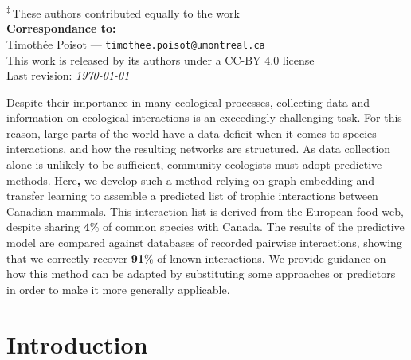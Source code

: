 \documentclass[11pt]{article}
\makeatletter
\def\maxwidth{\ifdim\Gin@nat@width>\linewidth\linewidth
\else\Gin@nat@width\fi}
\let\Oldincludegraphics\includegraphics
\renewcommand{\includegraphics}[1]{\Oldincludegraphics[width=\maxwidth]{#1}}
\providecommand{\DIFaddtex}[1]{{\bf #1}} %
\providecommand{\DIFdeltex}[1]{} %
\providecommand{\DIFaddbegin}{\protect\color{blue}} %
\providecommand{\DIFaddend}{\protect\color{black}} %
\providecommand{\DIFdelbegin}{\protect\color{red}} %
\providecommand{\DIFdelend}{\protect\color{black}} %
\providecommand{\DIFadd}[1]{\texorpdfstring{\DIFaddtex{#1}}{#1}} %
\providecommand{\DIFdel}[1]{\texorpdfstring{\DIFdeltex{#1}}{}} %
\newcommand{\DIFscaledelfig}{0.5}
\newlength{\DIFdelgraphicswidth} %
\newlength{\DIFdelgraphicsheight} %
\newcommand{\DIFaddincludegraphics}[2][]{{\color{blue}\fbox{\DIFOincludegraphics[#1]{#2}}}} %
\newcommand{\DIFdelincludegraphics}[2][]{%
\sbox{\DIFdelgraphicsbox}{\DIFOincludegraphics[#1]{#2}}%
\settoboxwidth{\DIFdelgraphicswidth}{\DIFdelgraphicsbox} %
\settoboxtotalheight{\DIFdelgraphicsheight}{\DIFdelgraphicsbox} %
\scalebox{\DIFscaledelfig}{%
\parbox[b]{\DIFdelgraphicswidth}{\usebox{\DIFdelgraphicsbox}\\[-\baselineskip] \rule{\DIFdelgraphicswidth}{0em}}\llap{\resizebox{\DIFdelgraphicswidth}{\DIFdelgraphicsheight}{%
\setlength{\unitlength}{\DIFdelgraphicswidth}%
\begin{picture}(1,1)%
\thicklines\linethickness{2pt} %
{\color[rgb]{1,0,0}\put(0,0){\framebox(1,1){}}}%
{\color[rgb]{1,0,0}\put(0,0){\line( 1,1){1}}}%
{\color[rgb]{1,0,0}\put(0,1){\line(1,-1){1}}}%
\end{picture}%
}\hspace*{3pt}}} %
} %
\DeclareRobustCommand{\DIFaddbegin}{\DIFOaddbegin \let\includegraphics\DIFaddincludegraphics} %
\DeclareRobustCommand{\DIFaddend}{\DIFOaddend \let\includegraphics\DIFOincludegraphics} %
\DeclareRobustCommand{\DIFdelbegin}{\DIFOdelbegin \let\includegraphics\DIFdelincludegraphics} %
\DeclareRobustCommand{\DIFdelend}{\DIFOaddend \let\includegraphics\DIFOincludegraphics} %
\makeatother
\begin{document}
\textsuperscript{‡}\,These authors contributed equally to the work\\

\textbf{Correspondance to:}\\
Timothée Poisot --- \texttt{timothee.poisot@umontreal.ca}\\

\vfill
This work is released by its authors under a CC-BY 4.0 license\hfill\ccby\\
Last revision: \emph{\today}

\clearpage
\thispagestyle{empty}

\vfill
Despite their importance in many ecological processes, collecting data
and information on ecological interactions is an exceedingly challenging
task. For this reason, large parts of the world have a data deficit when
it comes to species interactions, and how the resulting networks are
structured. As data collection alone is unlikely to be sufficient,
community ecologists must adopt predictive methods. Here\DIFaddbegin \DIFadd{, }\DIFaddend we develop
such a method \DIFdelbegin \DIFdel{, }\DIFdelend relying on graph embedding and transfer learning to
assemble a predicted list of trophic interactions between Canadian
mammals. This interaction list is derived from the European food web,
despite sharing \DIFdelbegin \DIFdel{only 5}\DIFdelend \DIFaddbegin \DIFadd{4}\DIFaddend \% of common species with Canada. The results of the
predictive model are compared against databases of recorded pairwise
interactions, showing that we correctly recover \DIFdelbegin \DIFdel{over 95}\DIFdelend \DIFaddbegin \DIFadd{91}\DIFaddend \% of known
interactions. We provide guidance on how this method can be adapted by
substituting some approaches or predictors in order to make it more
generally applicable.



\vfill

\clearpage
\linenumbers
\pagestyle{normal}

\hypertarget{introduction}{%
\section{Introduction}\label{introduction}}
\end{document}
